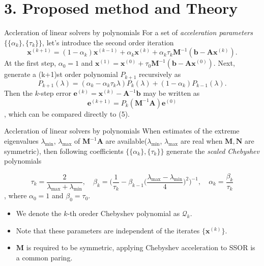 \documentclass[10pt]{beamer}
\begin{document}
\section{3. Proposed method and Theory}
\begin{frame}{Accleration of linear solvers by polynomials}
For a set of \emph{\color{blue}acceleration parameters} $\{ \{\alpha_k\}, \{\tau_k\}\}$, 
let's introduce the second order iteration
    \begin{equation}
        \mathbf{x}^{(k+1)} = (1-\alpha_k)\mathbf{x}^{(k-1)} + \alpha_k \mathbf{x}^{(k)} +
        \alpha_k\tau_k\mathbf{M}^{-1}(\mathbf{b} - \mathbf{A}\mathbf{x}^{(k)}).
    \end{equation}
At the first step, $\alpha_0 = 1$ and 
$\mathbf{x}^{(1)} = \mathbf{x}^{(0)} + \tau_0\mathbf{M}^{-1}(\mathbf{b} - \mathbf{A}\mathbf{x}^{(0)})$.
Next, generate a (k+1)st order polynomial $P_{k+1}$ recursively as
    \begin{equation}
        P_{k+1}(\lambda) = (\alpha_k - \alpha_k\tau_k\lambda)P_k(\lambda) + (1-\alpha_k)P_{k-1}(\lambda).
    \end{equation}
Then the $k$-step error $\mathbf{e}^{(k)} = \mathbf{x}^{(k)} - \mathbf{A}^{-1}\mathbf{b}$ may be
written as 
    \begin{equation}
        \mathbf{e}^{(k+1)} = P_k(\mathbf{M}^{-1}\mathbf{A}) \mathbf{e}^{(0)}    
    \end{equation}
, which can be compared directly to (5).
\end{frame}

\begin{frame}{Accleration of linear solvers by polynomials}
When estimates of the extreme eigenvalues $\lambda_{\min}$, $\lambda_{\max}$ of 
$\mathbf{M}^{-1}\mathbf{A}$ are available($\lambda_{\min}$, $\lambda_{\max}$ are real when
$\mathbf{M}, \mathbf{N}$ are symmetric), then following coefficients
$\{ \{\alpha_k\}, \{\tau_k\}\}$ generate the \emph{\color{blue}scaled Chebyshev} polynomials

\begin{equation}
    \tau_k = \frac{2}{\lambda_{\max} + \lambda_{\min}}, \quad
    \beta_k = \bigg( \frac{1}{\tau_k} - \beta_{k-1}
    \bigg( \frac{\lambda_{\max} - \lambda_{\min}}{4}
    \bigg)^2 \bigg)^{-1}, \quad
    \alpha_k = \frac{\beta_k}{\tau_k}
\end{equation}
, where $\alpha_0 = 1$ and $\beta_0 = \tau_0$.
\begin{itemize}
    \item We denote the $k$-th oreder Chebyshev polynomial as $\mathcal{Q}_k$.
    \item Note that these parameters are independent of the iterates $\{\mathbf{x}^{(k)}\}$.
    \item $\mathbf{M}$ is required to be symmetric, applying Chebyshev acceleration to SSOR
    is a common paring.
\end{itemize}
\end{frame}
\end{document}
